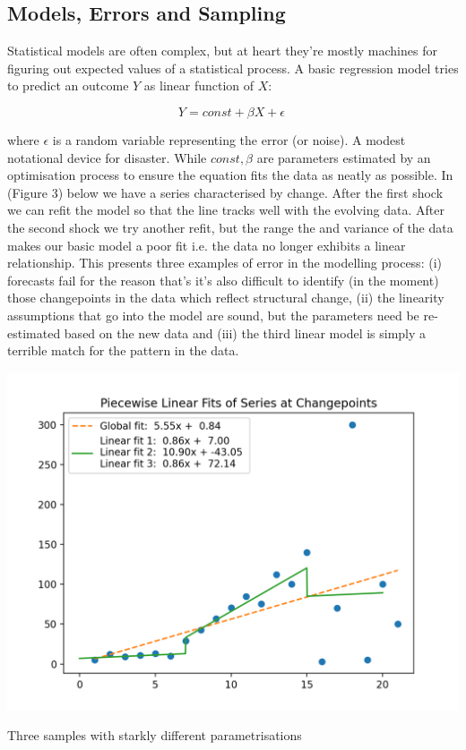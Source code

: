 \documentclass{tufte-handout}
\begin{document}
\subsection{Models, Errors and Sampling}
Statistical models are often complex, but at heart they're mostly machines for figuring out expected values of a statistical process. A basic regression model tries to predict an outcome $Y$ as linear function of $X$:

$$ Y = const + \beta X + \epsilon  \ $$

\noindent where $\epsilon$ is a random variable representing the error (or noise). A modest notational device for disaster. While $const, \beta$ are parameters estimated by an optimisation process to ensure the equation fits the data as neatly as possible. In (Figure 3) below we have a series characterised by change. After the first shock we can refit the model so that the line tracks well with the evolving data. After the second shock we try another refit, but the range the and variance of the data makes our basic model a poor fit i.e. the data no longer exhibits a linear relationship. This presents three examples of error in the modelling process: (i) forecasts fail for the reason that's it's also difficult to identify (in the moment) those changepoints in the data which reflect structural change, (ii)  the linearity assumptions that go into the model are sound, but the parameters need be re-estimated based on the new data and (iii) the third linear model is simply a terrible match for the pattern in the data.
\linebreak 
\begin{marginfigure}
  \includegraphics[width=\linewidth]{../Expectation/Plots/piecewise_linear_fits.png}
  \caption{Three samples with starkly different parametrisations}
\end{marginfigure}
\end{document}
